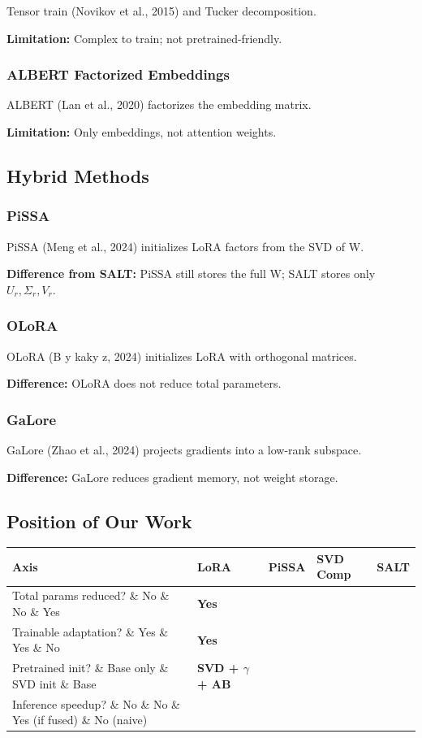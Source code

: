 Tensor train (Novikov et al., 2015) and Tucker decomposition.

\textbf{Limitation:} Complex to train; not pretrained-friendly.

\subsubsection{ALBERT Factorized Embeddings}

ALBERT (Lan et al., 2020) factorizes the embedding matrix.

\textbf{Limitation:} Only embeddings, not attention weights.

\subsection{Hybrid Methods}

\subsubsection{PiSSA}

PiSSA (Meng et al., 2024) initializes LoRA factors from the SVD of W.

\textbf{Difference from SALT:} PiSSA still stores the full W; SALT stores only 
$U_r, \Sigma_r, V_r$.

\subsubsection{OLoRA}

OLoRA (B y kaky z, 2024) initializes LoRA with orthogonal matrices.

\textbf{Difference:} OLoRA does not reduce total parameters.

\subsubsection{GaLore}

GaLore (Zhao et al., 2024) projects gradients into a low-rank subspace.

\textbf{Difference:} GaLore reduces gradient memory, not weight storage.

\subsection{Position of Our Work}

\begin{table}[H]
\centering
\small
\begin{tabular}{lllll}
\toprule
\textbf{Axis} & \textbf{LoRA} & \textbf{PiSSA} & \textbf{SVD Comp} & \textbf{SALT} \\
\midrule
Total params reduced? \& No \& No \& Yes & \textbf{Yes} \\
Trainable adaptation? \& Yes \& Yes \& No & \textbf{Yes} \\
Pretrained init? \& Base only \& SVD init \& Base & \textbf{SVD + $\gamma$ + AB} \\
Inference speedup? \& No \& No \& Yes (if fused) \& No (naive) \\
\bottomrule
\end{tabular}
\end{table}

